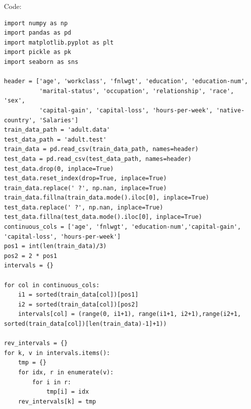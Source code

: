 \documentclass[a4paper, 11pt]{article}
\begin{document}
Code:
\begin{lstlisting}
import numpy as np
import pandas as pd
import matplotlib.pyplot as plt
import pickle as pk
import seaborn as sns

header = ['age', 'workclass', 'fnlwgt', 'education', 'education-num',
          'marital-status', 'occupation', 'relationship', 'race', 'sex',
          'capital-gain', 'capital-loss', 'hours-per-week', 'native-country', 'Salaries']
train_data_path = 'adult.data'
test_data_path = 'adult.test'
train_data = pd.read_csv(train_data_path, names=header)
test_data = pd.read_csv(test_data_path, names=header)
test_data.drop(0, inplace=True)
test_data.reset_index(drop=True, inplace=True)
train_data.replace(' ?', np.nan, inplace=True)
train_data.fillna(train_data.mode().iloc[0], inplace=True)
test_data.replace(' ?', np.nan, inplace=True)
test_data.fillna(test_data.mode().iloc[0], inplace=True)
continuous_cols = ['age', 'fnlwgt', 'education-num','capital-gain', 'capital-loss', 'hours-per-week']
pos1 = int(len(train_data)/3)
pos2 = 2 * pos1
intervals = {}

for col in continuous_cols:
    i1 = sorted(train_data[col])[pos1]
    i2 = sorted(train_data[col])[pos2]
    intervals[col] = (range(0, i1+1), range(i1+1, i2+1),range(i2+1, sorted(train_data[col])[len(train_data)-1]+1))

rev_intervals = {}
for k, v in intervals.items():
    tmp = {}
    for idx, r in enumerate(v):
        for i in r:
            tmp[i] = idx
    rev_intervals[k] = tmp


\end{lstlisting}
\end{document}
